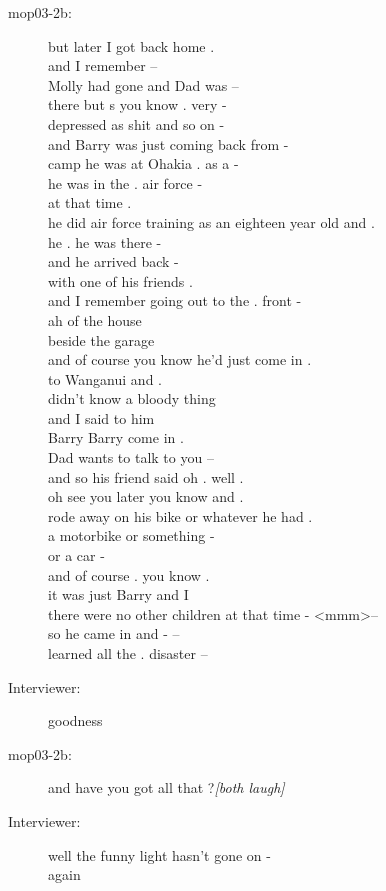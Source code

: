 \documentclass{article}
\newcommand{\turn}[2]{
\item[#1:] #2
}
\begin{document}
\begin{description}
\turn{mop03-2b}{but later I got back home .\\
and I remember --\\
Molly had gone and Dad was --\\
there but s you know . very -\\
depressed as shit and so on -\\
and Barry was just coming back from -\\
camp he was at Ohakia . as a -\\
he was in the . air force -\\
at that time .\\
he did air force training as an eighteen year old and .\\
he . he was there -\\
and he arrived back -\\
with one of his friends .\\
and I remember going out to the . front -\\
ah of the house\\
beside the garage\\
and of course you know he'd just come in .\\
to Wanganui and .\\
didn't know a bloody thing\\
and I said to him\\
Barry Barry come in .\\
Dad wants to talk to you --\\
and so his friend said oh . well .\\
oh see you later you know and .\\
rode away on his bike or whatever he had .\\
a motorbike or something -\\
or a car -\\
and of course . you know .\\
it was just Barry and I\\
there were no other children at that time - \textless mmm\textgreater  --\\
so he came in and - --\\
learned all the . disaster --}

\turn{Interviewer}{goodness}

\turn{mop03-2b}{and have you got all that ?\textit{[both laugh]} }

\turn{Interviewer}{ well the funny light hasn't gone on -\\
again}


\end{description}
\end{document}
